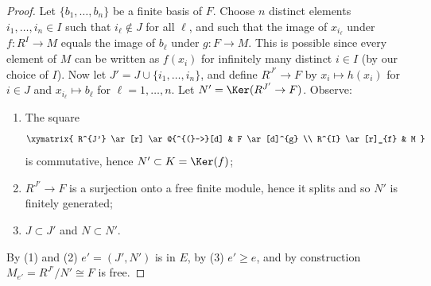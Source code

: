 \begin{proof}
\medskip\noindent
Let $\{ b_1, \ldots, b_n \}$ be a finite basis of $F$.  Choose $n$ distinct
elements $i_1, \ldots, i_n \in I$ such that $i_{\ell} \notin J$ for all $\ell$,
and such that the image of $x_{i_{\ell}}$ under $f: R^I \to M$ equals
the image of $b_{\ell}$ under $g: F \to M$.  This is possible since
every element of $M$ can be written as $f(x_i)$ for infinitely many
distinct $i \in I$ (by our choice of $I$).  Now let
$J' = J \cup \{i_1, \ldots , i_n \}$, and define $R^{J'}
\to F$ by $x_i \mapsto h(x_i)$ for $i \in J$ and $x_{i_{\ell}} \mapsto
b_{\ell}$ for $\ell = 1, \ldots, n$.  Let $N' = \Ker(R^{J'} \to F)$.
Observe:
\begin{enumerate}
\item The square
$$
\xymatrix{
R^{J'} \ar[r] \ar@{^{(}->}[d] & F \ar[d]^{g} \\
R^{I} \ar[r]_{f} & M
}
$$
is commutative,
hence $N' \subset K = \Ker(f)$;
\item $R^{J'} \to F$ is a surjection onto a free finite module, hence
it splits and so $N'$ is finitely generated;
\item $J \subset J'$ and $N \subset N'$.
\end{enumerate}
By (1) and (2) $e' = (J', N')$ is in $E$, by (3) $e' \geq e$, and by
construction $M_{e'} = R^{J'}/N' \cong F$ is free.
\end{proof}